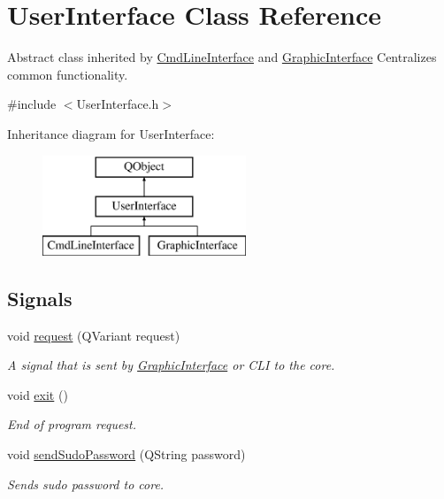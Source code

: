 \hypertarget{class_user_interface}{}\section{User\+Interface Class Reference}
\label{class_user_interface}


Abstract class inherited by \hyperlink{class_cmd_line_interface}{Cmd\+Line\+Interface} and \hyperlink{class_graphic_interface}{Graphic\+Interface} Centralizes common functionality.  




{\ttfamily \#include $<$User\+Interface.\+h$>$}

Inheritance diagram for User\+Interface\+:\begin{figure}[H]
\begin{center}
\leavevmode
\includegraphics[height=3.000000cm]{class_user_interface}
\end{center}
\end{figure}
\subsection*{Signals}
\begin{DoxyCompactItemize}
\item 
void \hyperlink{class_user_interface_a99db050a753be9c1fc6071f73edd95f6}{request} (Q\+Variant request)
\begin{DoxyCompactList}\small\item\em A signal that is sent by \hyperlink{class_graphic_interface}{Graphic\+Interface} or C\+LI to the core. \end{DoxyCompactList}\item 
void \hyperlink{class_user_interface_a396eb29856a6afc91bc0e0eef1de2df7}{exit} ()
\begin{DoxyCompactList}\small\item\em End of program request. \end{DoxyCompactList}\item 
void \hyperlink{class_user_interface_a808baf8281c287a87568f9f3fd586350}{send\+Sudo\+Password} (Q\+String password)
\begin{DoxyCompactList}\small\item\em Sends sudo password to core. \end{DoxyCompactList}\end{DoxyCompactItemize}
